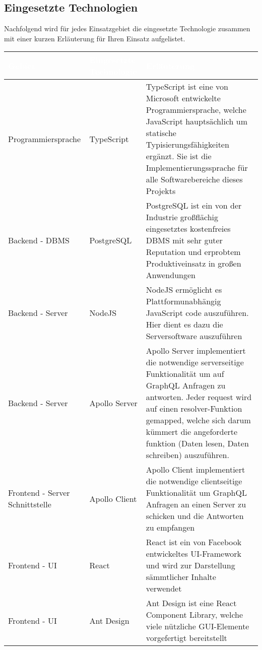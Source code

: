 \documentclass[a4paper,12pt]{article}
\begin{document}
\subsection{Eingesetzte Technologien}
Nachfolgend wird für jedes Einsatzgebiet die eingesetzte Technologie zusammen mit einer kurzen Erläuterung
für Ihren Einsatz aufgelistet.

\begin{center}
      \begin{tabular}{|m{4cm}|m{5cm}|m{10cm}|}
            \hline
        \rowcolor{TUMBlue} \textcolor{white}{\textbf{Gebiet}} & \textcolor{white}{\textbf{Eingesetzte Technologie}} & \textcolor{white}{\textbf{Erläuterung}} \\
        \hline
        Programmiersprache & TypeScript & TypeScript ist eine von Microsoft entwickelte Programmiersprache, welche JavaScript hauptsächlich um statische Typisierungsfähigkeiten ergänzt. Sie ist die Implementierungssprache für alle Softwarebereiche dieses Projekts \\
        \hline
        Backend - DBMS & PostgreSQL & PostgreSQL ist ein von der Industrie großflächig eingesetztes kostenfreies DBMS mit sehr guter Reputation und erprobtem Produktiveinsatz in großen Anwendungen \\
        \hline
        Backend - Server & NodeJS & NodeJS ermöglicht es Plattformunabhängig JavaScript code auszuführen. Hier dient es dazu die Serversoftware auszuführen \\
        \hline
        Backend - Server & Apollo Server & Apollo Server implementiert die notwendige serverseitige Funktionalität um auf GraphQL Anfragen zu antworten. Jeder request wird auf einen resolver-Funktion gemapped, welche sich darum kümmert die angeforderte funktion (Daten lesen, Daten schreiben) auszuführen. \\
        \hline
        Frontend - Server Schnittstelle & Apollo Client & Apollo Client implementiert die notwendige clientseitige Funktionalität um GraphQL Anfragen an einen Server zu schicken und die Antworten zu empfangen \\
        \hline
        Frontend - UI & React & React ist ein von Facebook entwickeltes UI-Framework und wird zur Darstellung sämmtlicher Inhalte verwendet \\
        \hline
        Frontend - UI & Ant Design & Ant Design ist eine React Component Library, welche viele nützliche GUI-Elemente vorgefertigt bereitstellt \\
        \hline
      \end{tabular}
\end{center}
\end{document}
